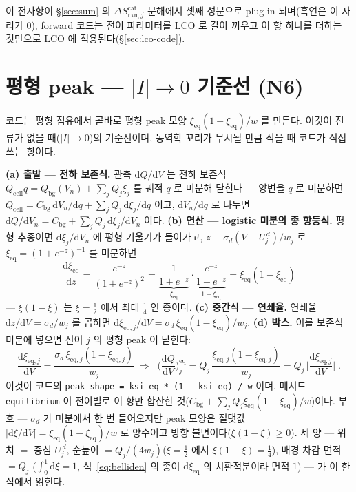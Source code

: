 \documentclass[11pt,a4paper]{article}
\newcommand{\dd}{\mathrm{d}}
\newcommand{\eq}{\mathrm{eq}}
\newcommand{\cell}{\mathrm{cell}}
\newcommand{\bg}{\mathrm{bg}}
\newcommand{\rxn}{\mathrm{rxn}}
\newcommand{\code}[1]{\texttt{#1}}
\begin{document}
이 전자항이 \S\ref{sec:sum} 의 $\Delta S_{\rxn,j}^\mathrm{cat}$ 분해에서 셋째 성분으로 plug-in 되며(흑연은 이 자리가 0),
forward 코드는 전이 파라미터를 LCO 로 갈아 끼우고 이 항 하나를 더하는 것만으로 LCO 에 적용된다(\S\ref{sec:lco-code}).

\section{평형 peak — $|I|\to0$ 기준선 (N6)}\label{sec:eqpeak}
코드는 평형 점유에서 곧바로 평형 peak 모양 $\xi_\eq(1-\xi_\eq)/w$ 를 만든다. 이것이 전류가 없을 때($|I|\to0$)의
기준선이며, 동역학 꼬리가 무시될 만큼 작을 때 코드가 직접 쓰는 항이다.

\textbf{(a) 출발 — 전하 보존식.} 관측 $\dd Q/\dd V$ 는 전하 보존식 $Q_\cell q=Q_\bg(V_n)+\sum_jQ_j\xi_j$ 를 궤적
$q$ 로 미분해 닫힌다 — 양변을 $q$ 로 미분하면 $Q_\cell=C_\bg\,\dd V_n/\dd q+\sum_jQ_j\,\dd\xi_j/\dd q$ 이고,
$\dd V_n/\dd q$ 로 나누면 $\dd Q/\dd V_n=C_\bg+\sum_jQ_j\,\dd\xi_j/\dd V_n$ 이다. \textbf{(b) 연산 — logistic
미분의 종 항등식.} 평형 추종이면 $\dd\xi_j/\dd V_n$ 에 평형 기울기가 들어가고, $z\equiv\sigma_d(V-U_j^{\,d})/w_j$ 로
$\xi_\eq=(1+e^{-z})^{-1}$ 를 미분하면
\begin{equation}
\frac{\dd\xi_\eq}{\dd z}=\frac{e^{-z}}{(1+e^{-z})^2}
=\underbrace{\frac{1}{1+e^{-z}}}_{\xi_\eq}\cdot\underbrace{\frac{e^{-z}}{1+e^{-z}}}_{1-\xi_\eq}
=\xi_\eq(1-\xi_\eq)
\label{eq:belliden}
\end{equation}
— $\xi(1-\xi)$ 는 $\xi=\tfrac12$ 에서 최대 $\tfrac14$ 인 종이다. \textbf{(c) 중간식 — 연쇄율.} 연쇄율
$\dd z/\dd V=\sigma_d/w_j$ 를 곱하면 $\dd\xi_{\eq,j}/\dd V=\sigma_d\,\xi_\eq(1-\xi_\eq)/w_j$. \textbf{(d) 박스.}
이를 보존식 미분에 넣으면 전이 $j$ 의 평형 peak 이 닫힌다:
\begin{equation}
\frac{\dd\xi_{\eq,j}}{\dd V}=\frac{\sigma_d\,\xi_{\eq,j}(1-\xi_{\eq,j})}{w_j}
\;\Longrightarrow\;
\boxed{\;\Big(\frac{\dd Q}{\dd V}\Big)^\eq_j
=Q_j\,\frac{\xi_{\eq,j}(1-\xi_{\eq,j})}{w_j}
=Q_j\,\Big|\frac{\dd\xi_{\eq,j}}{\dd V}\Big|\;.}
\label{eq:eqpeak}
\end{equation}
이것이 코드의 \code{peak\_shape = ksi\_eq * (1 - ksi\_eq) / w} 이며, 메서드 \code{equilibrium} 이 전이별로 이 항만
합산한 것($C_\bg+\sum_jQ_j\xi_\eq(1-\xi_\eq)/w$)이다. 부호 — $\sigma_d$ 가 미분에서 한 번 들어오지만 peak 모양은
절댓값 $|\dd\xi/\dd V|=\xi_\eq(1-\xi_\eq)/w$ 로 양수이고 방향 불변이다($\xi(1-\xi)\ge0$). 세 양 — 위치 $=$ 중심
$U_j^{\,d}$, 순높이 $=Q_j/(4w_j)$($\xi=\tfrac12$ 에서 $\xi(1-\xi)=\tfrac14$), 배경 차감 면적 $=Q_j$
($\int_0^1\dd\xi=1$, 식~\eqref{eq:belliden} 의 종이 $\dd\xi_\eq$ 의 치환적분이라 면적 $1$) — 가 이 한 식에서 읽힌다.
\end{document}
